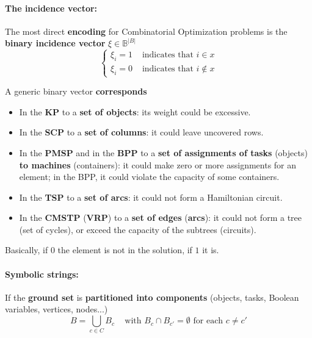 \paragraph{The incidence vector:} The most direct \textbf{encoding} for Combinatorial Optimization problems is the \textbf{binary incidence vector} $\xi \in \mathbb{B}^{|B|}$
$$ 
\begin{cases}
	\xi_i = 1 & \text{ indicates that } i \in x \\
	\xi_i = 0 & \text{ indicates that } i \notin x
\end{cases}
$$

A generic binary vector \textbf{corresponds}
\begin{itemize}
	\item In the \textbf{KP} to a \textbf{set of objects}: its weight could be excessive.\\
	
	\item In the \textbf{SCP} to a \textbf{set of columns}: it could leave uncovered rows.\\
	
	\item In the \textbf{PMSP} and in the \textbf{BPP} to a \textbf{set of assignments of tasks} (objects) \textbf{to machines} (containers): it could make zero or more assignments for an element; in the BPP, it could violate the capacity of some containers.\\
	
	\item In the \textbf{TSP} to a \textbf{set of arcs}: it could not form a Hamiltonian circuit.\\
	
	\item In the \textbf{CMSTP} (\textbf{VRP}) to a \textbf{set of edges} (\textbf{arcs}): it could not form a tree (set of cycles), or exceed the capacity of the subtrees (circuits).\\
\end{itemize}

Basically, if $0$ the element is not in the solution, if $1$ it is.\\

\newpage

\paragraph{Symbolic strings:} If the \textbf{ground set} is \textbf{partitioned into components} (objects, tasks, Boolean variables, vertices, nodes...)
$$ B = \bigcup_{c \in C} B_c \;\;\; \text{ with } B_c \cap B_{c'} = \emptyset \text{ for each } c \neq c' $$

